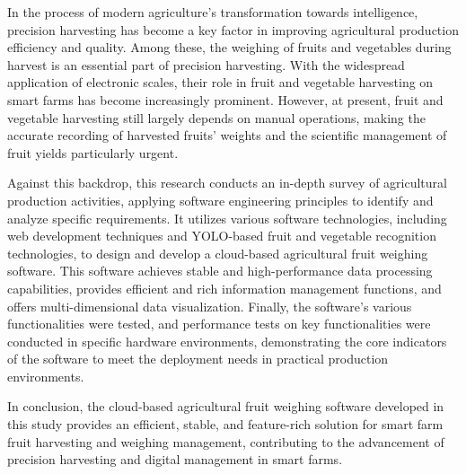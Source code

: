 In the process of modern agriculture's transformation towards intelligence, precision harvesting has become a key factor in improving agricultural production efficiency and quality. Among these, the weighing of fruits and vegetables during harvest is an essential part of precision harvesting. With the widespread application of electronic scales, their role in fruit and vegetable harvesting on smart farms has become increasingly prominent. However, at present, fruit and vegetable harvesting still largely depends on manual operations, making the accurate recording of harvested fruits' weights and the scientific management of fruit yields particularly urgent.

Against this backdrop, this research conducts an in-depth survey of agricultural production activities, applying software engineering principles to identify and analyze specific requirements. It utilizes various software technologies, including web development techniques and YOLO-based fruit and vegetable recognition technologies, to design and develop a cloud-based agricultural fruit weighing software. This software achieves stable and high-performance data processing capabilities, provides efficient and rich information management functions, and offers multi-dimensional data visualization. Finally, the software's various functionalities were tested, and performance tests on key functionalities were conducted in specific hardware environments, demonstrating the core indicators of the software to meet the deployment needs in practical production environments.

In conclusion, the cloud-based agricultural fruit weighing software developed in this study provides an efficient, stable, and feature-rich solution for smart farm fruit harvesting and weighing management, contributing to the advancement of precision harvesting and digital management in smart farms.